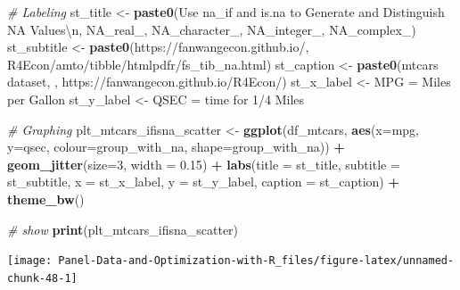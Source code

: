\documentclass[
]{book}
\newenvironment{Shaded}{\begin{snugshade}}{\end{snugshade}}
\newcommand{\CharTok}[1]{\textcolor[rgb]{0.31,0.60,0.02}{#1}}
\newcommand{\CommentTok}[1]{\textcolor[rgb]{0.56,0.35,0.01}{\textit{#1}}}
\newcommand{\DataTypeTok}[1]{\textcolor[rgb]{0.13,0.29,0.53}{#1}}
\newcommand{\DecValTok}[1]{\textcolor[rgb]{0.00,0.00,0.81}{#1}}
\newcommand{\FloatTok}[1]{\textcolor[rgb]{0.00,0.00,0.81}{#1}}
\newcommand{\KeywordTok}[1]{\textcolor[rgb]{0.13,0.29,0.53}{\textbf{#1}}}
\newcommand{\NormalTok}[1]{#1}
\newcommand{\OperatorTok}[1]{\textcolor[rgb]{0.81,0.36,0.00}{\textbf{#1}}}
\newcommand{\StringTok}[1]{\textcolor[rgb]{0.31,0.60,0.02}{#1}}
\begin{document}
\begin{Shaded}
\begin{Highlighting}[]
\CommentTok{\# Labeling}
\NormalTok{st\_title \textless{}{-}}\StringTok{ }\KeywordTok{paste0}\NormalTok{(}\StringTok{\textquotesingle{}Use na\_if and is.na to Generate and Distinguish NA Values}\CharTok{\textbackslash{}n}\StringTok{\textquotesingle{}}\NormalTok{,}
                   \StringTok{\textquotesingle{}NA\_real\_, NA\_character\_, NA\_integer\_, NA\_complex\_\textquotesingle{}}\NormalTok{)}
\NormalTok{st\_subtitle \textless{}{-}}\StringTok{ }\KeywordTok{paste0}\NormalTok{(}\StringTok{\textquotesingle{}https://fanwangecon.github.io/\textquotesingle{}}\NormalTok{,}
                      \StringTok{\textquotesingle{}R4Econ/amto/tibble/htmlpdfr/fs\_tib\_na.html\textquotesingle{}}\NormalTok{)}
\NormalTok{st\_caption \textless{}{-}}\StringTok{ }\KeywordTok{paste0}\NormalTok{(}\StringTok{\textquotesingle{}mtcars dataset, \textquotesingle{}}\NormalTok{,}
                     \StringTok{\textquotesingle{}https://fanwangecon.github.io/R4Econ/\textquotesingle{}}\NormalTok{)}
\NormalTok{st\_x\_label \textless{}{-}}\StringTok{ \textquotesingle{}MPG = Miles per Gallon\textquotesingle{}}
\NormalTok{st\_y\_label \textless{}{-}}\StringTok{ \textquotesingle{}QSEC = time for 1/4 Miles\textquotesingle{}}

\CommentTok{\# Graphing}
\NormalTok{plt\_mtcars\_ifisna\_scatter \textless{}{-}}\StringTok{ }
\StringTok{  }\KeywordTok{ggplot}\NormalTok{(df\_mtcars, }
         \KeywordTok{aes}\NormalTok{(}\DataTypeTok{x=}\NormalTok{mpg, }\DataTypeTok{y=}\NormalTok{qsec, }
             \DataTypeTok{colour=}\NormalTok{group\_with\_na, }
             \DataTypeTok{shape=}\NormalTok{group\_with\_na)) }\OperatorTok{+}
\StringTok{  }\KeywordTok{geom\_jitter}\NormalTok{(}\DataTypeTok{size=}\DecValTok{3}\NormalTok{, }\DataTypeTok{width =} \FloatTok{0.15}\NormalTok{) }\OperatorTok{+}
\StringTok{  }\KeywordTok{labs}\NormalTok{(}\DataTypeTok{title =}\NormalTok{ st\_title, }\DataTypeTok{subtitle =}\NormalTok{ st\_subtitle,}
       \DataTypeTok{x =}\NormalTok{ st\_x\_label, }\DataTypeTok{y =}\NormalTok{ st\_y\_label, }\DataTypeTok{caption =}\NormalTok{ st\_caption) }\OperatorTok{+}
\StringTok{  }\KeywordTok{theme\_bw}\NormalTok{()}

\CommentTok{\# show}
\KeywordTok{print}\NormalTok{(plt\_mtcars\_ifisna\_scatter)}
\end{Highlighting}
\end{Shaded}

\begin{center}\texttt{[image: Panel-Data-and-Optimization-with-R\_files/figure-latex/unnamed-chunk-48-1]} \end{center}
\end{document}
